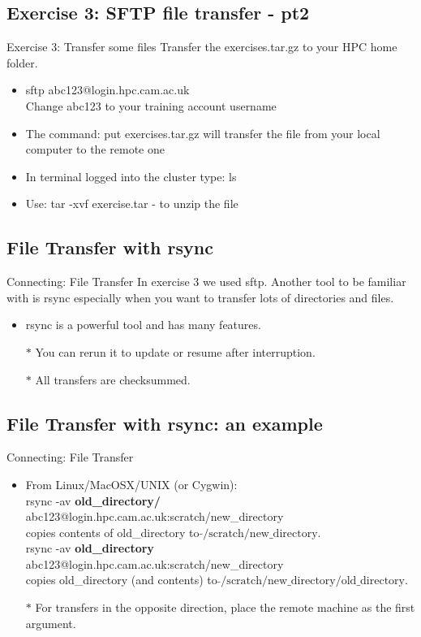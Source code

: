 \subsection{Exercise 3: SFTP file transfer - pt2}
\begin{frame}{Exercise 3: Transfer some files}
Transfer the exercises.tar.gz to your HPC home folder.
\begin{itemize}
\item \alert{\footnotesize sftp abc123@login.hpc.cam.ac.uk}\\
Change abc123 to your training account username
\item{The command: \alert{\footnotesize put exercises.tar.gz} will transfer the file from your local computer to the remote one}
\item{In terminal logged into the cluster type: ls}
\item{Use: tar -xvf exercise.tar  - to unzip the file}
\end{itemize}
\end{frame}

\subsection{File Transfer with rsync}
\begin{frame}{Connecting: File Transfer}
In exercise 3 we used sftp. Another tool to be familiar with is rsync especially when you want to transfer lots of directories and files.
\begin{itemize}
\item{rsync is a powerful tool and has many features.}
\item[$\ast$]You can rerun it to update or resume after interruption.
\item[$\ast$]All transfers are checksummed.
\end{itemize}
\end{frame}
%
\subsection{File Transfer with rsync: an example}
\begin{frame}{Connecting: File Transfer}
\begin{itemize}
\item From Linux/MacOSX/UNIX (or Cygwin):\hfill\\
\alert{\footnotesize rsync -av \textbf{old\_directory/} abc123@login.hpc.cam.ac.uk:scratch/new\_directory}\hfill\\
copies contents of old\_directory to $\tilde{}\text{/scratch/new\_directory}$.\hfill\\\smallskip
\pause
\alert{\footnotesize rsync -av \textbf{old\_directory} abc123@login.hpc.cam.ac.uk:scratch/new\_directory}\hfill\\
copies old\_directory (and contents) to $\tilde{}\text{/scratch/new\_directory/old\_directory}$.\hfill\\
\pause
\item[$\ast$]For transfers in the opposite direction, place the remote machine as the first argument.
\end{itemize}
\end{frame}
%
